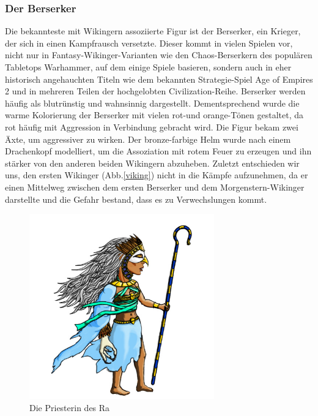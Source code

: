 \documentclass[extern,palatino]{cgBA}
\begin{document}
\subsubsection{Der Berserker}
Die bekannteste mit Wikingern assoziierte Figur ist der Berserker, ein Krieger, der sich in einen Kampfrausch versetzte. Dieser kommt in vielen Spielen vor, nicht nur in Fantasy-Wikinger-Varianten wie den Chaos-Berserkern des populären Tabletops Warhammer, auf dem einige Spiele basieren, sondern auch in eher historisch angehauchten Titeln wie dem bekannten Strategie-Spiel Age of Empires 2\cite{aoe2} und in mehreren Teilen der hochgelobten  Civilization-Reihe. Berserker werden häufig als blutrünstig und wahnsinnig dargestellt\cite{aoe2}. Dementsprechend wurde die warme Kolorierung der Berserker mit vielen rot-und orange-Tönen gestaltet, da rot häufig mit Aggression in Verbindung gebracht wird\cite{color2}. Die Figur bekam zwei Äxte, um aggressiver zu wirken. Der bronze-farbige Helm wurde nach einem Drachenkopf modelliert, um die Assoziation mit rotem Feuer zu erzeugen und ihn stärker von den anderen beiden Wikingern abzuheben. Zuletzt entschieden wir uns, den ersten Wikinger (Abb.\ref{viking}) nicht in die Kämpfe aufzunehmen, da er einen Mittelweg zwischen dem ersten Berserker und dem Morgenstern-Wikinger darstellte und die Gefahr bestand, dass es zu Verwechslungen kommt.
\newpage
\begin{figure}[H]
	\centering
	\includegraphics[height=8cm]{priestess.jpg}
	\caption{Die Priesterin des Ra}
	\label{priestess}
\end{figure}
\end{document}
